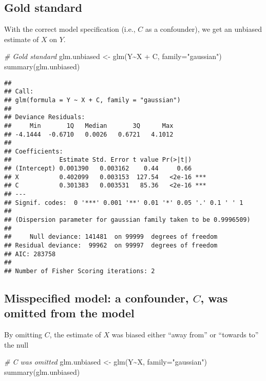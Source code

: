 \documentclass[
]{book}
\newenvironment{Shaded}{\begin{snugshade}}{\end{snugshade}}
\newcommand{\AttributeTok}[1]{\textcolor[rgb]{0.77,0.63,0.00}{#1}}
\newcommand{\CommentTok}[1]{\textcolor[rgb]{0.56,0.35,0.01}{\textit{#1}}}
\newcommand{\FunctionTok}[1]{\textcolor[rgb]{0.00,0.00,0.00}{#1}}
\newcommand{\NormalTok}[1]{#1}
\newcommand{\OtherTok}[1]{\textcolor[rgb]{0.56,0.35,0.01}{#1}}
\newcommand{\SpecialCharTok}[1]{\textcolor[rgb]{0.00,0.00,0.00}{#1}}
\newcommand{\StringTok}[1]{\textcolor[rgb]{0.31,0.60,0.02}{#1}}
\begin{document}
\hypertarget{gold-standard}{%
\subsection{Gold standard}\label{gold-standard}}

With the correct model specification (i.e., \(C\) as a confounder), we get an unbiased estimate of \(X\) on \(Y\).

\begin{Shaded}
\begin{Highlighting}[]
\CommentTok{\# Gold standard}
\NormalTok{glm.unbiased }\OtherTok{\textless{}{-}} \FunctionTok{glm}\NormalTok{(Y}\SpecialCharTok{\textasciitilde{}}\NormalTok{X }\SpecialCharTok{+}\NormalTok{ C, }\AttributeTok{family=}\StringTok{"gaussian"}\NormalTok{)}
\FunctionTok{summary}\NormalTok{(glm.unbiased)}
\end{Highlighting}
\end{Shaded}

\begin{verbatim}
## 
## Call:
## glm(formula = Y ~ X + C, family = "gaussian")
## 
## Deviance Residuals: 
##     Min       1Q   Median       3Q      Max  
## -4.1444  -0.6710   0.0026   0.6721   4.1012  
## 
## Coefficients:
##             Estimate Std. Error t value Pr(>|t|)    
## (Intercept) 0.001390   0.003162    0.44     0.66    
## X           0.402099   0.003153  127.54   <2e-16 ***
## C           0.301383   0.003531   85.36   <2e-16 ***
## ---
## Signif. codes:  0 '***' 0.001 '**' 0.01 '*' 0.05 '.' 0.1 ' ' 1
## 
## (Dispersion parameter for gaussian family taken to be 0.9996509)
## 
##     Null deviance: 141481  on 99999  degrees of freedom
## Residual deviance:  99962  on 99997  degrees of freedom
## AIC: 283758
## 
## Number of Fisher Scoring iterations: 2
\end{verbatim}

\hypertarget{misspecified-model-a-confounder-c-was-omitted-from-the-model}{%
\subsection{\texorpdfstring{Misspecified model: a confounder, \(C\), was omitted from the model}{Misspecified model: a confounder, C, was omitted from the model}}\label{misspecified-model-a-confounder-c-was-omitted-from-the-model}}

By omitting \(C\), the estimate of \(X\) was biased either ``away from'' or ``towards to'' the null

\begin{Shaded}
\begin{Highlighting}[]
\CommentTok{\# C was omitted}
\NormalTok{glm.unbiased }\OtherTok{\textless{}{-}} \FunctionTok{glm}\NormalTok{(Y}\SpecialCharTok{\textasciitilde{}}\NormalTok{X, }\AttributeTok{family=}\StringTok{"gaussian"}\NormalTok{)}
\FunctionTok{summary}\NormalTok{(glm.unbiased)}
\end{Highlighting}
\end{Shaded}
\end{document}
